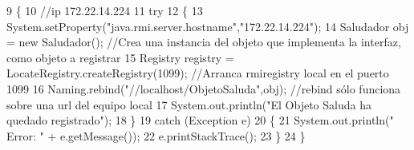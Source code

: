 \begin{DoxyCode}
9     \{
10         \textcolor{comment}{//ip 172.22.14.224}
11         \textcolor{keywordflow}{try}
12         \{
13             System.setProperty(\textcolor{stringliteral}{"java.rmi.server.hostname"},\textcolor{stringliteral}{"172.22.14.224"});
14             Saludador obj = \textcolor{keyword}{new} Saludador(); \textcolor{comment}{//Crea una instancia del objeto que implementa la interfaz,
       como objeto a registrar }
15             Registry registry = LocateRegistry.createRegistry(1099); \textcolor{comment}{//Arranca rmiregistry local en el
       puerto 1099}
16             Naming.rebind(\textcolor{stringliteral}{"//localhost/ObjetoSaluda"},obj);   \textcolor{comment}{//rebind sólo funciona sobre una url del
       equipo local }
17             System.out.println(\textcolor{stringliteral}{"El Objeto Saluda ha quedado registrado"});
18         \}
19         \textcolor{keywordflow}{catch} (Exception e)
20         \{
21             System.out.println(\textcolor{stringliteral}{" Error: "} + e.getMessage());
22             e.printStackTrace();
23         \}
24     \}
\end{DoxyCode}
